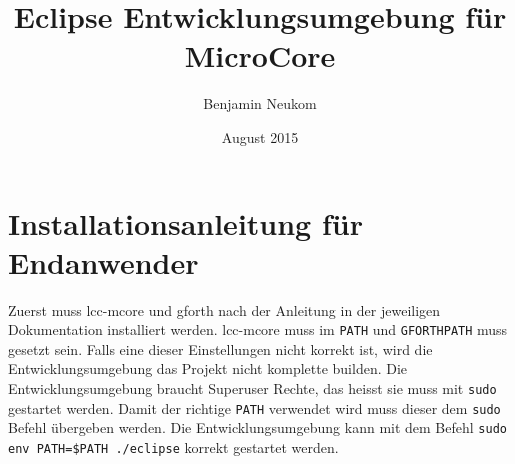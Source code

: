 \documentclass[listof=totocnumbered,bibliography=totocnumbered]{scrreprt}
\numberwithin{equation}{subsection}
\begin{document}
\subject{Bachelor-Thesis}
\title{Eclipse Entwicklungsumgebung für MicroCore}
\author{Benjamin Neukom}
\date{August 2015\\}
\publishers{Betreuer: Carlo Nicola}

\maketitle

\tableofcontents













\appendix


{}

\newpage

\listoffigures
\listoftables

\newpage
\chapter{Installationsanleitung für Endanwender}
\label{chap:installuser}

Zuerst muss lcc-mcore und gforth nach der Anleitung in der jeweiligen Dokumentation installiert werden. lcc-mcore muss im \verb!PATH! und \verb!GFORTHPATH! muss gesetzt sein. Falls eine dieser Einstellungen nicht korrekt ist, wird die Entwicklungsumgebung das Projekt nicht komplette builden. Die Entwicklungsumgebung braucht Superuser Rechte, das heisst sie muss mit \verb!sudo! gestartet werden. Damit der richtige \verb!PATH! verwendet wird muss dieser dem \verb!sudo! Befehl übergeben werden. Die Entwicklungsumgebung kann mit dem Befehl \verb!sudo env PATH=$PATH ./eclipse! korrekt gestartet werden.
\end{document}
